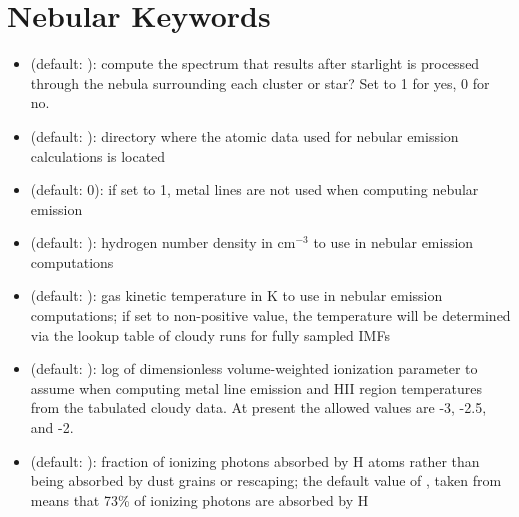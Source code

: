 \documentclass[letterpaper,10pt,english]{sphinxmanual}
\begin{document}
\section{Nebular Keywords}
\label{\detokenize{parameters:ssec-nebular-keywords}}\label{\detokenize{parameters:nebular-keywords}}\begin{itemize}
\item {} 
 (default: ): compute the spectrum that results after starlight is processed through the nebula surrounding each cluster or star? Set to 1 for yes, 0 for no.

\item {} 
 (default: ): directory where the atomic data used for nebular emission calculations is located

\item {} 
 (default: 0): if set to 1, metal lines are not used when computing nebular emission

\item {} 
 (default: ): hydrogen number density in \(\mathrm{cm}^{-3}\) to use in nebular emission computations

\item {} 
 (default: ): gas kinetic temperature in K to use in nebular emission computations; if set to non-positive value, the temperature will be determined via the lookup table of cloudy runs for fully sampled IMFs

\item {} 
 (default: ): log of dimensionless volume-weighted ionization parameter to assume when computing metal line emission and HII region temperatures from the tabulated cloudy data. At present the allowed values are -3, -2.5, and -2.

\item {} 
 (default: ): fraction of ionizing photons absorbed by H atoms rather than being absorbed by dust grains or rescaping; the default value of , taken from  means that 73\% of ionizing photons are absorbed by H

\end{itemize}
\end{document}
